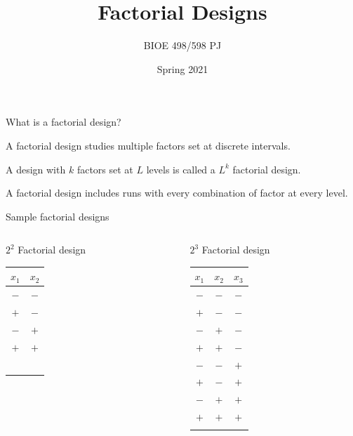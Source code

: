 \documentclass[10pt]{beamer}
\title{Factorial Designs}
\author{BIOE 498/598 PJ}
\date{Spring 2021}
\newcommand\lo{\ensuremath{\boldsymbol{-}}}
\newcommand\hi{\ensuremath{\boldsymbol{+}}}
\begin{document}
\frame{\titlepage}


\begin{frame}{What is a factorial design?}

A factorial design studies multiple factors set at discrete intervals.

\pause
\bigskip
A design with $k$ factors set at $L$ levels is called a $L^k$ factorial design.

\pause
\bigskip
A factorial design includes runs with every combination of factor at every level.

	
\end{frame}

\begin{frame}{Sample factorial designs}

\begin{columns}

\begin{column}{0.3\textwidth}
\begin{center}
$2^2$ Factorial design\\
\begin{tabular}{cc}
$x_1$ & $x_2$ \\
\hline
\lo & \lo \\
\hi & \lo \\
\lo & \hi \\
\hi & \hi \\
 & \\
 & \\
 & \\
 & \\
 & \\
\end{tabular}
\end{center}
\end{column}

\begin{column}{0.3\textwidth}
\begin{center}
$2^3$ Factorial design\\
\begin{tabular}{ccc}
$x_1$ & $x_2$ & $x_3$ \\
\hline
\lo & \lo & \lo \\
\hi & \lo & \lo \\
\lo & \hi & \lo \\
\hi & \hi & \lo \\
\lo & \lo & \hi \\
\hi & \lo & \hi \\
\lo & \hi & \hi \\
\hi & \hi & \hi \\
 & \\
\end{tabular}
\end{center}
\end{column}


\end{columns}
\end{frame}
\end{document}
